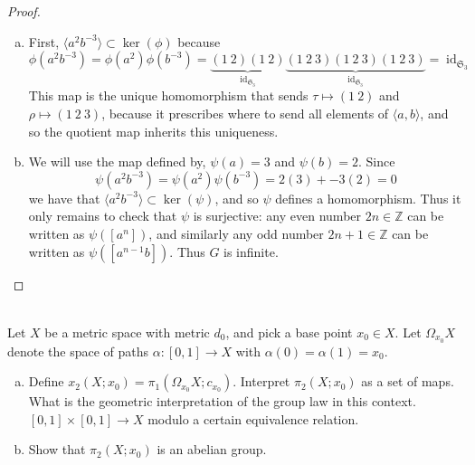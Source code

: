 \documentclass{article}
\newenvironment{problem}[2][Problem]{\begin{trivlist}
\item[\hskip \labelsep {\bfseries #1}\hskip \labelsep {\bfseries #2.}]}{\end{trivlist}}
\begin{document}
\begin{proof} \text{} \\
  \begin{enumerate}[a.]
    \item First, $\langle a^2b^{-3} \rangle \subset \ker(\phi)$ because \[
      \phi(a^2b^{-3})
      = \phi(a^2)\phi(b^{-3})
      = \underbrace{(1\ 2)(1\ 2)}_{\operatorname{id}_{\mathfrak S_3}}
      \underbrace{(1\ 2\ 3)(1\ 2\ 3)(1\ 2\ 3)}_{\operatorname{id}_{\mathfrak S_3}}
      = \operatorname{id}_{\mathfrak S_3}
    \]
    This map is the unique homomorphism that sends $\tau \mapsto (1\ 2)$ and
    $\rho \mapsto (1\ 2\ 3)$, because it prescribes where to send all elements
    of $\langle a, b \rangle$, and so the quotient map inherits this uniqueness.
    \item We will use the map defined by, $\psi(a) = 3$ and $\psi(b) = 2$.
    Since \[
      \psi(a^2b^{-3}) = \psi(a^2)\psi(b^{-3}) = 2(3) + -3(2) = 0
    \] we have that $\langle a^2b^{-3} \rangle \subset \ker(\psi)$, and so
    $\psi$ defines a homomorphism.
    Thus it only remains to check that $\psi$ is surjective:
    any even number $2n \in \mathbb Z$ can be written as $\psi([a^n])$, and
    similarly any odd number $2n + 1 \in \mathbb Z$ can be written as
    $\psi([a^{n-1}b])$.
    Thus $G$ is infinite.
  \end{enumerate}
\end{proof}
\pagebreak
\begin{problem}{3} \text{} \\
  Let $X$ be a metric space with metric $d_0$, and pick a base point
  $x_0 \in X$. Let $\Omega_{x_0}X$ denote the space of paths
  $\alpha\colon [0, 1] \rightarrow X$ with $\alpha(0) = \alpha(1) = x_0$.
  \begin{enumerate}[a.]
    \item Define $x_2(X; x_0) = \pi_1(\Omega_{x_0}X; c_{x_0})$.
    Interpret $\pi_2(X; x_0)$ as a set of maps. What is the geometric
    interpretation of the group law in this context.
    $[0, 1] \times [0, 1] \rightarrow X$ modulo a certain equivalence relation.
    \item Show that $\pi_2(X; x_0)$ is an abelian group.
  \end{enumerate}
\end{problem}
\end{document}
